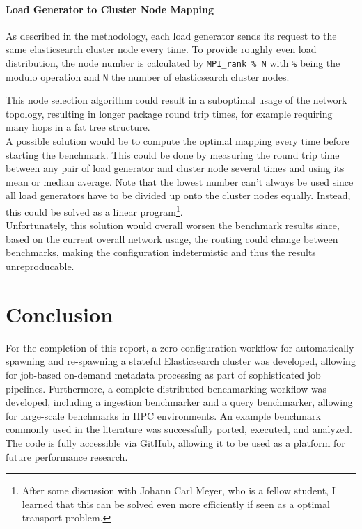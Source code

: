 \paragraph{Load Generator to Cluster Node Mapping} As described in the methodology, each load generator sends its request to the same elasticsearch cluster node every time. To provide roughly even load distribution, the node number is calculated by \texttt{MPI\_rank \% N} with \texttt{\%} being the modulo operation and \texttt{N} the number of elasticsearch cluster nodes.

This node selection algorithm could result in a suboptimal usage of the network topology, resulting in longer package round trip times, for example requiring many hops in a fat tree structure.\\

A possible solution would be to compute the optimal mapping every time before starting the benchmark. This could be done by measuring the round trip time between any pair of load generator and cluster node several times and using its mean or median average. Note that the lowest number can't always be used since all load generators have to be divided up onto the cluster nodes equally. Instead, this could be solved as a linear program\footnote{After some discussion with Johann Carl Meyer, who is a fellow student, I learned that this can be solved even more efficiently if seen as a optimal transport problem.}.\\

Unfortunately, this solution would overall worsen the benchmark results since, based on the current overall network usage, the routing could change between benchmarks, making the configuration indetermistic and thus the results unreproducable.

\section{Conclusion}
For the completion of this report, a zero-configuration workflow for automatically spawning and re-spawning a stateful Elasticsearch cluster was developed, allowing for job-based on-demand metadata processing as part of sophisticated job pipelines. Furthermore, a complete distributed benchmarking workflow was developed, including a ingestion benchmarker and a query benchmarker, allowing for large-scale benchmarks in \ac{HPC} environments. An example benchmark commonly used in the literature was successfully ported, executed, and analyzed. The code is fully accessible via GitHub, allowing it to be used as a platform for future performance research.

